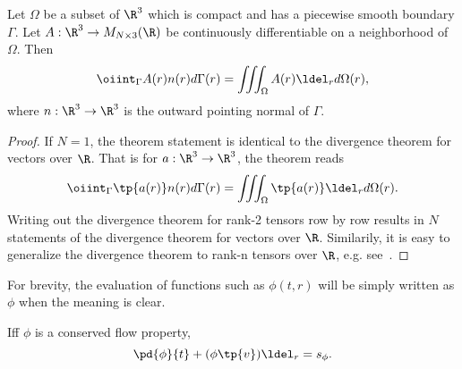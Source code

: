 \begin{thm}
    Let $\Omega$ be a subset of $\R^3$ which is compact and has
    a piecewise smooth boundary $\Gamma$.
    Let $A:\R^3 \to M_{N\times 3}(\R)$ be continuously differentiable
    on a neighborhood of $\Omega$.  Then
    \begin{equation}
        \oiint_\Gamma A(r) n(r) d\Gamma(r)
        = \iiint_\Omega A(r) \ldel_r d\Omega(r),
    \end{equation}
    where $n:\R^3\to \R^3$ is the outward pointing normal of $\Gamma$.
\end{thm}
\begin{proof}
    If $N=1$, the theorem statement is identical to the divergence theorem for vectors over $\R$.
    That is for $a:\R^3 \to \R^3$, the theorem reads
    \begin{equation}
        \oiint_\Gamma \tp{a(r)} n(r) d\Gamma(r)
        = \iiint_\Omega  \tp{a(r)} \ldel_r d\Omega(r).
    \end{equation}
    Writing out the divergence theorem for rank-2 tensors row by row results in $N$
    statements of the divergence theorem for vectors over $\R$.
    Similarily,  it is easy to generalize the divergence theorem to rank-n tensors over $\R$,
    e.g. see~\cite{riley}.
\end{proof}

\begin{rk}
    For brevity, the evaluation of functions such as $\phi(t,r)$ will be simply written
    as $\phi$ when the meaning is clear.
\end{rk}

\begin{thm}
Iff $\phi$ is a conserved flow property,
\begin{equation}
    \label{continuity0}
    \pd{\phi}{t} + ( \phi \tp{v} ) \ldel_r = s_\phi.
\end{equation}
\end{thm}

